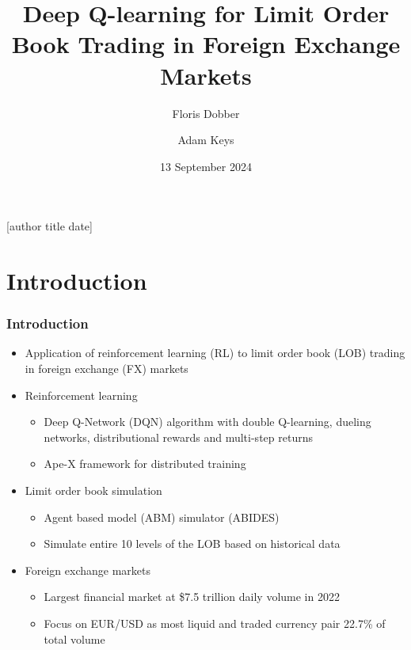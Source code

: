 \documentclass{beamer}
\title[]{Deep Q-learning for Limit Order Book Trading in Foreign Exchange Markets}
\author[Floris Dobber \and Adam Keys]{Floris Dobber \and Adam Keys}
\institute[UCL]{%
  Department of Computer Science \\ %
  University College London
}
\date{13 September 2024}
\begin{document}
\begin{frame}
  \titlepage
\end{frame}

[author title date]

\section{Introduction}

\begin{frame}
  \frametitle{Introduction}

  \begin{itemize}
    \item Application of reinforcement learning (RL) to limit order book (LOB) trading in foreign exchange (FX) markets
    \item Reinforcement learning
      \begin{itemize}
        \item Deep Q-Network (DQN) algorithm with double Q-learning, dueling networks, distributional rewards and multi-step returns
        \item Ape-X framework for distributed training
      \end{itemize}
    \item Limit order book simulation
      \begin{itemize}
        \item Agent based model (ABM) simulator (ABIDES)
        \item Simulate entire 10 levels of the LOB based on historical data
      \end{itemize}
    \item Foreign exchange markets
      \begin{itemize}
        \item Largest financial market at \$7.5 trillion daily volume in 2022 \cite{BIS2022triennial}
        \item Focus on EUR/USD as most liquid and traded currency pair 22.7\% of total volume \cite{BIS2022triennial}
      \end{itemize}
  \end{itemize}

\end{frame}
\end{document}
